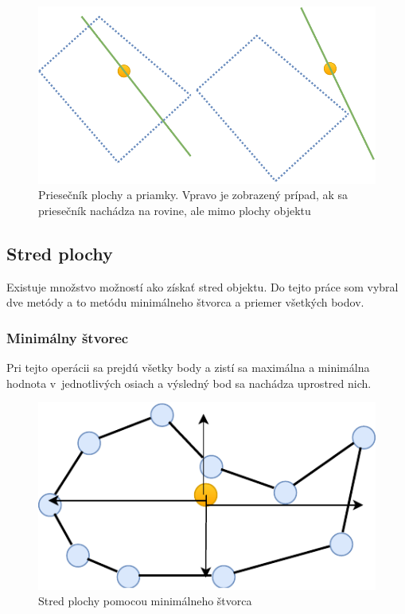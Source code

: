 \begin{figure}[H]
	\centering
	\includegraphics[height=0.3\textwidth]{obrazky-figures/Diagram/Draw/1Points/DP Navrh operacii-0D - PointIntersectionPlaneLine.pdf}
	\caption{Priesečník plochy a priamky. Vpravo je zobrazený prípad, ak sa priesečník nachádza na rovine, ale mimo plochy objektu}
	\label{fig:GraphIntersection_Plane_Line}
\end{figure}

\subsection*{Stred plochy}
Existuje množstvo možností ako získať stred objektu. Do tejto práce som vybral dve metódy a to metódu minimálneho štvorca a priemer všetkých bodov. %


\subsubsection{Minimálny štvorec}
Pri tejto operácii sa prejdú všetky body a zistí sa maximálna a minimálna hodnota v~jednotlivých osiach a výsledný bod sa nachádza uprostred nich.


\begin{figure}[H]
	\centering
	\includegraphics[height=0.3\textwidth]{obrazky-figures/Diagram/Draw/1Points/DP Navrh operacii-0D - PointMiddle of surface.pdf}
	\caption{Stred plochy pomocou minimálneho štvorca }
	\label{fig:PointMiddleofsurface}
\end{figure}



